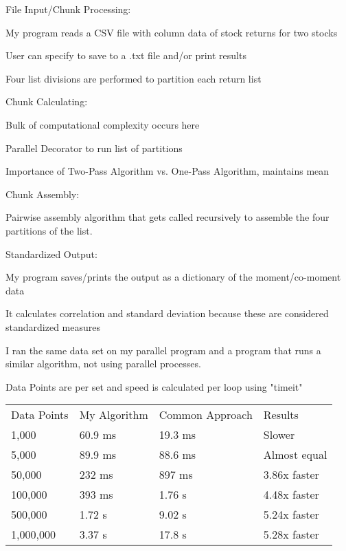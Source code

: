 \documentclass{beamer}
\begin{document}
\begin{frame}
File Input/Chunk Processing:

\textbullet My program reads a CSV file with column data of stock returns for two stocks

\textbullet User can specify to save to a .txt file and/or print results

\textbullet Four list divisions are performed to partition each return list
\end{frame}


\begin{frame}
Chunk Calculating:

\textbullet Bulk of computational complexity occurs here

\textbullet Parallel Decorator to run list of partitions

\textbullet Importance of Two-Pass Algorithm vs. One-Pass Algorithm, maintains mean

\vspace{1cm}
Chunk Assembly:

\textbullet Pairwise assembly algorithm that gets called recursively to assemble the four partitions of the list.

\end{frame}

\begin{frame}
Standardized Output:

\textbullet My program saves/prints the output as a dictionary of the moment/co-moment data

\textbullet It calculates correlation and standard deviation because these are considered standardized measures

\end{frame}

\begin{frame}
I ran the same data set on my parallel program and a program that runs a similar algorithm, not using parallel processes.

Data Points are per set and speed is calculated per loop using "timeit"
\begin{table}[h]
\begin{tabular}{llll}
Data Points& My Algorithm & Common Approach & Results \\
1,000 & 60.9 ms& 19.3 ms & Slower \\
5,000 & 89.9 ms& 88.6 ms & Almost equal \\
50,000 & 232 ms& 897 ms & 3.86x faster \\
100,000 & 393 ms& 1.76 s & 4.48x faster \\
500,000 & 1.72 s& 9.02 s & 5.24x faster \\
1,000,000 & 3.37 s& 17.8 s & 5.28x faster
\end{tabular}
\end{table}
\end{frame}
\end{document}
